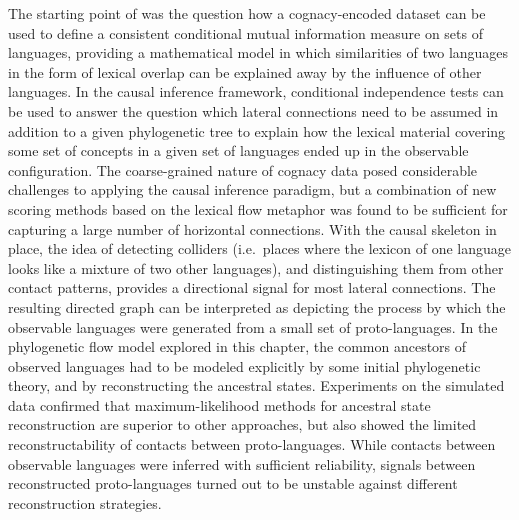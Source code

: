 The starting point of  was the question how a cognacy-encoded dataset can be used to define a consistent conditional mutual information measure on sets of languages, providing a mathematical model in which similarities of two languages in the form of lexical overlap can be explained away by the influence of other languages. In the causal inference framework, conditional independence tests can be used to answer the question which lateral connections need to be assumed in addition to a given phylogenetic tree to explain how the lexical material covering some set of concepts in a given set of languages ended up in the observable configuration. The coarse-grained nature of cognacy data posed considerable challenges to applying the causal inference paradigm, but a combination of new scoring methods based on the lexical flow metaphor was found to be sufficient for capturing a large number of horizontal connections. With the causal skeleton in place, the idea of detecting colliders (i.e.\ places where the 
lexicon of one language looks like a mixture of two other languages), and distinguishing them from other contact patterns, provides a directional signal for most lateral connections. The resulting directed graph can be interpreted as depicting the process by which the observable languages were generated from a small set of proto-languages. In the phylogenetic flow model explored in this chapter, the common ancestors of observed languages had to be modeled explicitly by some initial phylogenetic theory, and by reconstructing the ancestral states. Experiments on the simulated data confirmed that maximum-likelihood methods for ancestral state reconstruction are superior to other approaches, but also showed the limited reconstructability of contacts between proto-languages. While contacts between observable languages were inferred with sufficient reliability, signals between reconstructed proto-languages turned out to be unstable against different reconstruction strategies.

